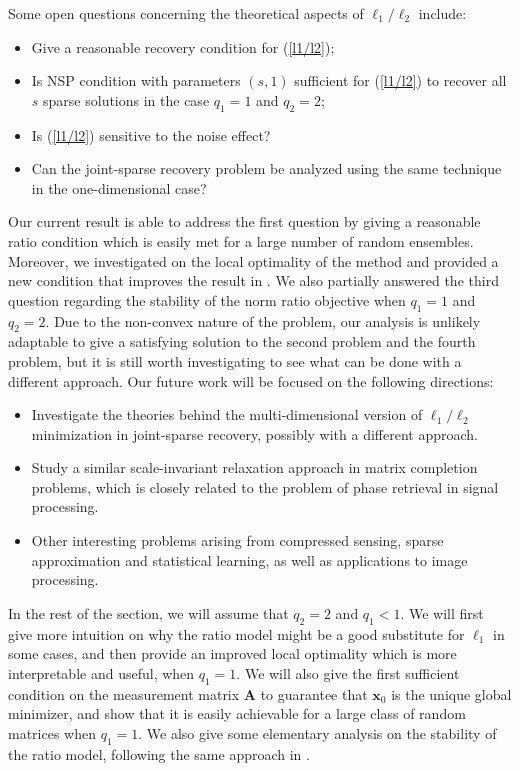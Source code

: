 \documentclass[11pt]{article}
\numberwithin{equation}{section}
\theoremstyle{plain}
\theoremstyle{definition}
\def\A{{\mathbf A}}
\def\x{{\mathbf x}}
\begin{document}
Some open questions concerning the theoretical aspects of $\ell_1/\ell_2$ include:
\begin{itemize}
\item Give a reasonable recovery condition for (\ref{l1/l2});
\item Is NSP condition with parameters $(s, 1)$ sufficient for (\ref{l1/l2}) to recover all $s$ sparse solutions in the case $q_1=1$ and $q_2=2$;
\item Is (\ref{l1/l2}) sensitive to the noise effect?
\item Can the joint-sparse recovery problem be analyzed using the same technique in the one-dimensional case?  
\end{itemize}


Our current result is able to address the first question by giving a reasonable ratio condition which is easily met for a large number of random ensembles. Moreover, we investigated on the local optimality of the method and provided a new condition that improves the result in \cite{rahimi2018scale}. We also partially answered the third question regarding the stability of the norm ratio objective when $q_1=1$ and $q_2=2$. Due to the non-convex nature of the problem, our analysis is unlikely adaptable to give a satisfying solution to the second problem and the fourth problem, but it is still worth investigating to see what can be done with a different approach. Our future work will be focused on the following directions:
\begin{itemize}
\item Investigate the theories behind the multi-dimensional version of $\ell_1/\ell_2$ minimization in joint-sparse recovery, possibly with a different approach.
\item Study a similar scale-invariant relaxation approach in matrix completion problems, which is closely related to the problem of phase retrieval in signal processing. 
\item Other interesting problems arising from compressed sensing, sparse approximation and statistical learning, as well as applications to image processing.
\end{itemize}   

In the rest of the section, we will assume that $q_2=2$ and $q_1<1$.  We will first give more intuition on why the ratio model might be a good substitute for $\ell_1$ in some cases, and then provide an improved local optimality which is more interpretable and useful, when $q_1=1$. We will also give the first sufficient condition on the measurement matrix $\A$ to guarantee that $\x_0$ is the unique global minimizer, and show that it is easily achievable for a large class of random matrices when $q_1=1$. We also give some elementary analysis on the stability of the ratio model, following the same approach in \cite{zhang2013theory}.   
\end{document}
